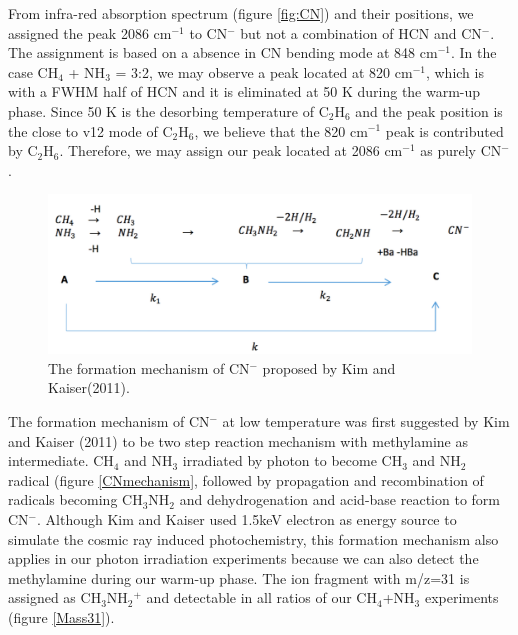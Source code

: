 From infra-red absorption spectrum (figure \ref{fig:CN}) and their positions, we assigned the peak 2086 cm$^{-1}$ to CN$^-$  but not a combination of HCN and CN$^-$. The assignment is based on a absence in CN bending mode at 848 cm$^{-1}$. In the case CH$_4$ + NH$_3$ = 3:2, we may observe a peak located at 820 cm$^{-1}$, which is with a FWHM half of HCN and it is eliminated at 50 K during the warm-up phase. Since 50 K is the desorbing temperature of C$_2$H$_6$ and the peak position is the close to v12 mode of C$_2$H$_6$, we believe that the 820 cm$^{-1}$ peak is contributed by C$_2$H$_6$. Therefore, we may assign our peak located at 2086 cm$^{-1}$ as purely CN$^-$.\\

\begin{figure}
\centering
\includegraphics[width=\textwidth]{figures/chapter3/CNmechanism}
\caption{The formation mechanism of CN$^-$ proposed by Kim and Kaiser(2011). }
\label{fig:CNmechanism}
\end{figure}

The formation mechanism of CN$^-$ at low temperature was first suggested by Kim and Kaiser (2011) to be two step reaction mechanism with methylamine as intermediate. CH$_4$ and NH$_3$ irradiated by photon to become CH$_3$ and NH$_2$ radical (figure \ref{CNmechanism}, followed by propagation and recombination of radicals becoming CH$_3$NH$_2$ and dehydrogenation and acid-base reaction to form CN$^-$.
Although Kim and Kaiser used 1.5keV electron as energy source to simulate the cosmic ray induced photochemistry, this formation mechanism also applies in our photon irradiation experiments because we can also detect the methylamine during our warm-up phase. The ion fragment with m/z=31 is assigned as CH$_3$NH$_2$$^+$ and detectable in all ratios of our CH$_4$+NH$_3$ experiments (figure \ref{Mass31}).

